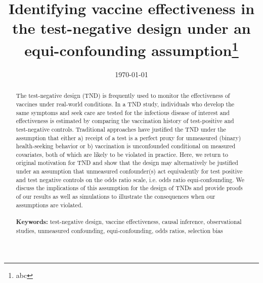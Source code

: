 \documentclass[11pt]{article}
\begin{document}
\begin{titlepage}
\title{Identifying vaccine effectiveness in the test-negative design under an equi-confounding assumption\thanks{abc}}
\author[1]{ }
\date{\today}
\maketitle

\begin{abstract}
    The test-negative design (TND) is frequently used to monitor the effectiveness of vaccines under real-world conditions. In a TND study, individuals who develop the same symptoms and seek care are tested for the infectious disease of interest and effectiveness is estimated by comparing the vaccination history of test-positive and test-negative controls. Traditional approaches have justified the TND under the assumption that either a) receipt of a test is a perfect proxy for unmeasured (binary) health-seeking behavior or b) vaccination is unconfounded conditional on measured covariates, both of which are likely to be violated in practice. Here, we return to original motivation for TND and show that the design may alternatively be justified under an assumption that unmeasured confounder(s) act equivalently for test positive and test negative controls on the odds ratio scale, i.e. odds ratio equi-confounding. We discuss the implications of this assumption for the design of TNDs and provide proofs of our results as well as simulations to illustrate the consequences when our assumptions are violated.
\noindent \\
\vspace{0in} \\
\noindent\textbf{Keywords:} test-negative design, vaccine effectiveness, causal inference, observational studies, unmeasured confounding, equi-confounding, odds ratios, selection bias
\bigskip
\end{abstract}
\setcounter{page}{0}
\thispagestyle{empty}
\end{titlepage}
\pagebreak \newpage

\doublespacing
\end{document}
